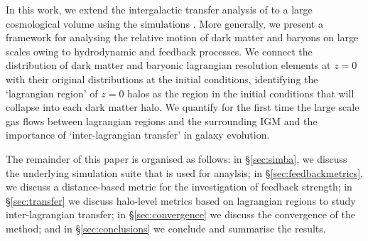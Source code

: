 In this work, we extend the intergalactic transfer analysis of
\citet{AnglesAlcazar2017} to a large cosmological volume using the \simba{}
simulations \citep{Dave2019}. More generally, we present a framework for
analysing the relative motion of dark matter and baryons on large scales
owing to hydrodynamic and feedback processes. We connect the distribution of
dark matter and baryonic lagrangian resolution elements at $z=0$ with their
original distributions at the initial conditions, identifying the `lagrangian
region' of $z=0$ halos as the region in the initial conditions that will
collapse into each dark matter halo. We quantify for the first time the large
scale gas flows between lagrangian regions and the surrounding IGM and the
importance of `inter-lagrangian transfer' in galaxy evolution.

The remainder of this paper is organised as follows: in \S\ref{sec:simba}, we
discuss the underlying \simba{} simulation suite that is used for anaylsis;
in \S\ref{sec:feedbackmetrics}, we discuss a distance-based metric for the
investigation of feedback strength; in \S\ref{sec:transfer} we discuss
halo-level metrics based on lagrangian regions to study inter-lagrangian
transfer; in \S\ref{sec:convergence} we discuss the convergence of the method;
and in \S\ref{sec:conclusions} we conclude and summarise the results.